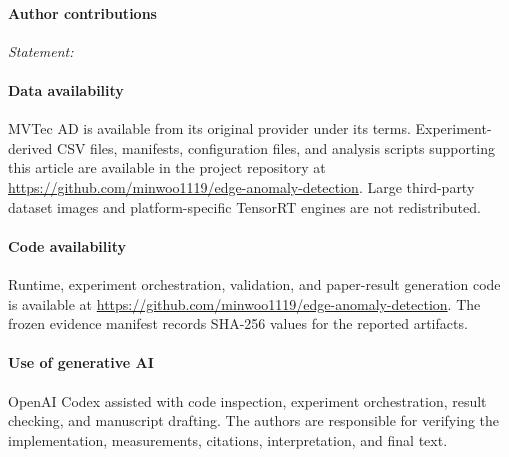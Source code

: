 \documentclass[twocolumn]{svjour3}
\newcommand{\blankfield}[1]{\textit{#1: }\underline{\hspace{3.0cm}}}
\begin{document}
\paragraph{Author contributions} \blankfield{Statement}

\paragraph{Data availability} MVTec AD is available from its original provider under its terms. Experiment-derived CSV files, manifests, configuration files, and analysis scripts supporting this article are available in the project repository at \url{https://github.com/minwoo1119/edge-anomaly-detection}. Large third-party dataset images and platform-specific TensorRT engines are not redistributed.

\paragraph{Code availability} Runtime, experiment orchestration, validation, and paper-result generation code is available at \url{https://github.com/minwoo1119/edge-anomaly-detection}. The frozen evidence manifest records SHA-256 values for the reported artifacts.

\paragraph{Use of generative AI} OpenAI Codex assisted with code inspection, experiment orchestration, result checking, and manuscript drafting. The authors are responsible for verifying the implementation, measurements, citations, interpretation, and final text.



\end{document}
